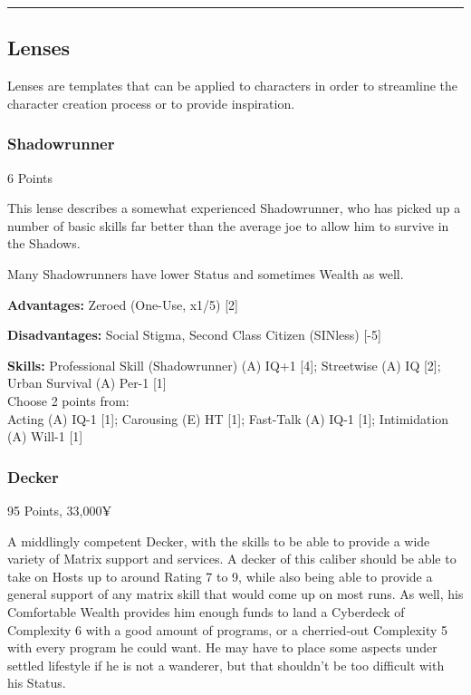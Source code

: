 \par\rule{\textwidth}{0.5pt} 

\begin{multicols}{2}
	
	\subsection{Lenses}
	
	Lenses are templates that can be applied to characters in order to streamline the character creation process or to provide inspiration.
	
	\subsubsection{Shadowrunner}
	\begin{flushright}
		6 Points
	\end{flushright}
	
	This lense describes a somewhat experienced Shadowrunner, who has picked up a number of basic skills far better than the average joe to allow him to survive in the Shadows.
	
	Many Shadowrunners have lower Status and sometimes Wealth as well.
	
	
	\textbf{Advantages:}
	Zeroed (One-Use, x1/5) [2]
	
	\textbf{Disadvantages:}
	Social Stigma, Second Class Citizen (SINless) [-5]
	
	\textbf{Skills:}
	Professional Skill (Shadowrunner) (A) IQ+1 [4]; Streetwise (A) IQ [2]; Urban Survival (A) Per-1 [1]\\
	Choose 2 points from:\\
	Acting (A) IQ-1 [1]; Carousing (E) HT [1]; Fast-Talk (A) IQ-1 [1]; Intimidation (A) Will-1 [1]
	
	\subsubsection{Decker}
	\begin{flushright}
		95 Points, 33,000¥
	\end{flushright}
	
	A middlingly competent Decker, with the skills to be able to provide a wide variety of Matrix support and services. A decker of this caliber should be able to take on Hosts up to around Rating 7 to 9, while also being able to provide a general support of any matrix skill that would come up on most runs. As well, his Comfortable Wealth provides him enough funds to land a Cyberdeck of Complexity 6 with a good amount of programs, or a cherried-out Complexity 5 with every program he could want. He may have to place some aspects under settled lifestyle if he is not a wanderer, but that shouldn't be too difficult with his Status.
	

\end{multicols}
